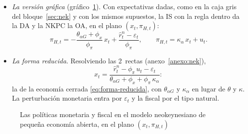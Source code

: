 \documentclass[11pt]{article}
\begin{document}
\begin{itemize}
  \begin{equation}
  i_t=\rho+\phi_\pi\,\pi_{H,t}+\phi_x\,x_t+\varepsilon_t . \label{eq:taylor-abierta}
  \end{equation}
  \begin{itemize}
  \item \emph{Por qué}: usa variables que se observan; reproduce casi la misma senda que el objetivo estricto\nocite{Furlanetto2006Fiscal,GaliMonacelli2005Monetary}; mantiene la regla del bloque~\ref{sec:nek}, con la inflación de lo que se produce, y permite el mismo gráfico. Las otras 2~quedan como referencias: el objetivo estricto, como el óptimo, y el tipo fijo, como la unión monetaria.
  \end{itemize}
\item \emph{La versión gráfica} (gráfico~\ref{fig:pea-perturbaciones}). Con expectativas dadas, como en la caja gris del bloque~\ref{sec:nek} y con los mismos supuestos, la IS con la regla dentro da la DA y la NKPC la OA, en el plano $(x_t,\pi_{H,t})$:
  \begin{equation}
  \pi_{H,t}=-\frac{\theta_{\alpha G}+\phi_x}{\phi_\pi}\,x_t+\frac{\hat r^n_t-\varepsilon_t}{\phi_\pi},\qquad \pi_{H,t}=\kappa_\alpha\,x_t+u_t . \label{eq:da-abierta-nek}
  \end{equation}
\item \emph{La forma reducida}. Resolviendo las 2~rectas (anexo~\ref{anexo:nek}),
  \begin{equation}
  x_t=\frac{\hat r^n_t-\phi_{\pi}\,u_t-\varepsilon_t}{\theta_{\alpha G}+\phi_x+\phi_{\pi}\,\kappa_\alpha} : \label{eq:forma-reducida-abierta}
  \end{equation}
  la de la economía cerrada \eqref{eq:forma-reducida}, con $\theta_{\alpha G}$ y $\kappa_\alpha$ en lugar de $\theta$ y $\kappa$. La perturbación monetaria entra por $\varepsilon_t$ y la fiscal por el tipo natural.
\end{itemize}

\begin{figure}[H]
\centering
\caption{Las políticas monetaria y fiscal en el modelo neokeynesiano de pequeña economía abierta, en el plano $(x_t,\pi_{H,t})$}\label{fig:pea-perturbaciones}
\end{figure}
\end{document}
